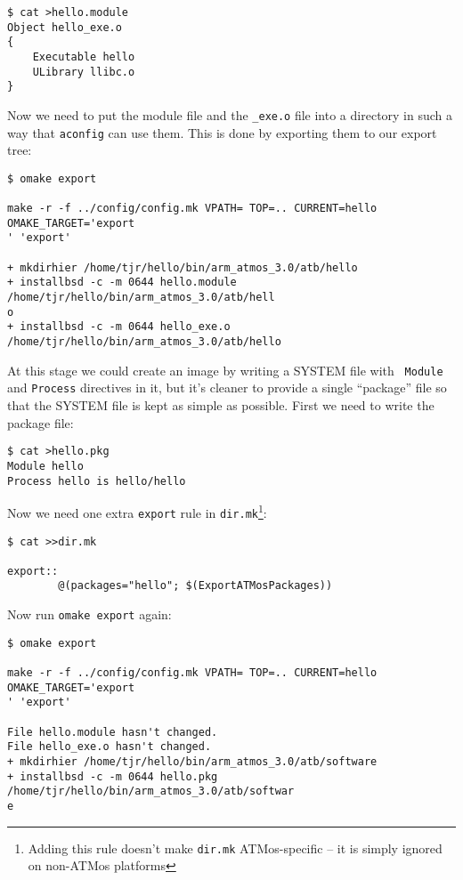 \documentclass[11pt,twoside,onecolumn]{article}
\begin{document}
{\footnotesize \begin{verbatim}
$ cat >hello.module
Object hello_exe.o
{
    Executable hello
    ULibrary llibc.o
}
\end{verbatim}}

Now we need to put the module file and the \verb|_exe.o| file into a directory
in such a way that {\tt aconfig} can use them.  This is done by exporting them
to our export tree:

{\footnotesize \begin{verbatim}
$ omake export

make -r -f ../config/config.mk VPATH= TOP=.. CURRENT=hello OMAKE_TARGET='export
' 'export'

+ mkdirhier /home/tjr/hello/bin/arm_atmos_3.0/atb/hello 
+ installbsd -c -m 0644 hello.module /home/tjr/hello/bin/arm_atmos_3.0/atb/hell
o 
+ installbsd -c -m 0644 hello_exe.o /home/tjr/hello/bin/arm_atmos_3.0/atb/hello
\end{verbatim}}

At this stage we could create an image by writing a SYSTEM file with {\tt
Module} and {\tt Process} directives in it, but it's cleaner to provide a
single ``package'' file so that the SYSTEM file is kept as simple as possible.
First we need to write the package file:

{\footnotesize \begin{verbatim}
$ cat >hello.pkg
Module hello
Process hello is hello/hello
\end{verbatim}}

Now we need one extra {\tt export} rule in {\tt dir.mk}\footnote{Adding this
rule doesn't make {\tt dir.mk} ATMos-specific -- it is simply ignored on
non-ATMos platforms}:

{\footnotesize \begin{verbatim}
$ cat >>dir.mk

export::
        @(packages="hello"; $(ExportATMosPackages))
\end{verbatim}}

Now run {\tt omake export} again:

{\footnotesize \begin{verbatim}
$ omake export

make -r -f ../config/config.mk VPATH= TOP=.. CURRENT=hello OMAKE_TARGET='export
' 'export'

File hello.module hasn't changed.
File hello_exe.o hasn't changed.
+ mkdirhier /home/tjr/hello/bin/arm_atmos_3.0/atb/software 
+ installbsd -c -m 0644 hello.pkg /home/tjr/hello/bin/arm_atmos_3.0/atb/softwar
e 
\end{verbatim}}
\end{document}
